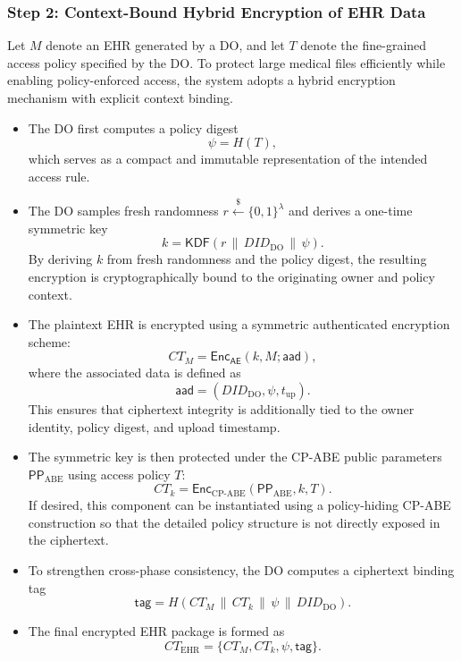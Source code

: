 \documentclass[conference]{IEEEtran}
\begin{document}
\subsubsection*{Step 2: Context-Bound Hybrid Encryption of EHR Data}

Let $M$ denote an EHR generated by a DO, and let $T$ denote the fine-grained access policy specified by the DO. To protect large medical files efficiently while enabling policy-enforced access, the system adopts a hybrid encryption mechanism with explicit context binding.

\begin{itemize}

\item The DO first computes a policy digest
\[
\psi = H(T),
\]
which serves as a compact and immutable representation of the intended access rule.

\item The DO samples fresh randomness $r \xleftarrow{\$} \{0,1\}^{\lambda}$ and derives a one-time symmetric key
\[
k = \textsf{KDF}(r \,\|\, DID_{\text{DO}} \,\|\, \psi).
\]
By deriving $k$ from fresh randomness and the policy digest, the resulting encryption is cryptographically bound to the originating owner and policy context.

\item The plaintext EHR is encrypted using a symmetric authenticated encryption scheme:
\[
CT_M = \textsf{Enc}_{\textsf{AE}}(k, M; \textsf{aad}),
\]
where the associated data is defined as
\[
\textsf{aad} = (DID_{\text{DO}}, \psi, t_{\text{up}}).
\]
This ensures that ciphertext integrity is additionally tied to the owner identity, policy digest, and upload timestamp.

\item The symmetric key is then protected under the CP-ABE public parameters $\mathsf{PP}_{\text{ABE}}$ using access policy $T$:
\[
CT_k = \textsf{Enc}_{\text{CP-ABE}}(\mathsf{PP}_{\text{ABE}}, k, T).
\]
If desired, this component can be instantiated using a policy-hiding CP-ABE construction so that the detailed policy structure is not directly exposed in the ciphertext.

\item To strengthen cross-phase consistency, the DO computes a ciphertext binding tag
\[
\mathsf{tag} = H(CT_M \,\|\, CT_k \,\|\, \psi \,\|\, DID_{\text{DO}}).
\]

\item The final encrypted EHR package is formed as
\[
CT_{\text{EHR}} = \{CT_M, CT_k, \psi, \mathsf{tag}\}.
\]

\end{itemize}
\end{document}
